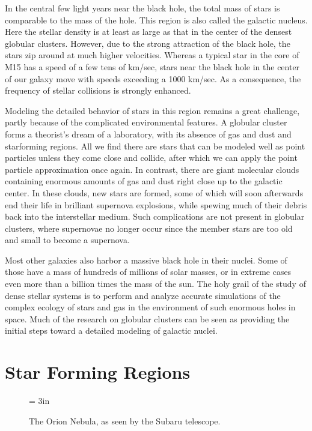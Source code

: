 In the central few light years near the black hole, the total mass of
stars is comparable to the mass of the hole.  This region is also
called the galactic nucleus.  Here the stellar density is at least as
large as that in the center of the densest globular clusters.  However,
due to the strong attraction of the black hole, the stars zip around at
much higher velocities.  Whereas a typical star in the core of M15 has
a speed of a few tens of km/sec, stars near the black hole in the
center of our galaxy move with speeds exceeding a 1000 km/sec.  As a
consequence, the frequency of stellar collisions is strongly enhanced.

Modeling the detailed behavior of stars in this region remains a great
challenge, partly because of the complicated environmental features.
A globular cluster forms a theorist's dream of a laboratory, with its
absence of gas and dust and starforming regions.  All we find there
are stars that can be modeled well as point particles unless they come
close and collide, after which we can apply the point particle
approximation once again.  In contrast, there are giant molecular
clouds containing enormous amounts of gas and dust right close up to
the galactic center.  In these clouds, new stars are formed, some of
which will soon afterwards end their life in brilliant supernova
explosions, while spewing much of their debris back into the
interstellar medium.  Such complications are not present in globular
clusters, where supernovae no longer occur since the member stars are
too old and small to become a supernova.

Most other galaxies also harbor a massive black hole in their nuclei.
Some of those have a mass of hundreds of millions of solar masses, or
in extreme cases even more than a billion times the mass of the sun.
The holy grail of the study of dense stellar systems is to perform and
analyze accurate simulations of the complex ecology of stars and gas
in the environment of such enormous holes in space.  Much of the
research on globular clusters can be seen as providing the initial
steps toward a detailed modeling of galactic nuclei.

\section{Star Forming Regions}

\begin{figure}[ht]
\begin{center}
\epsfxsize = 3in
\caption[The Orion Nebula]
{The Orion Nebula, as seen by the Subaru telescope.}
\label{fig:orion}
\end{center}
\end{figure}

